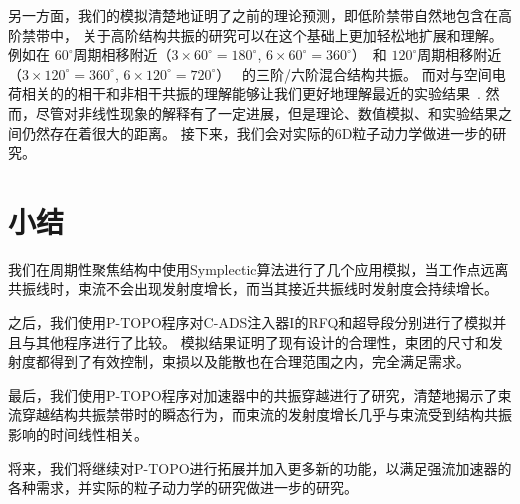 另一方面，我们的模拟清楚地证明了之前的理论预测，即低阶禁带自然地包含在高阶禁带中，
关于高阶结构共振的研究可以在这个基础上更加轻松地扩展和理解。
例如在 $60^{\circ}$周期相移附近（$3 \times 60^{\circ} = 180^{\circ}$, $6 \times 60^{\circ} = 360^{\circ}$）~\cite{16}和 $120^{\circ}$周期相移附近（$3 \times 120^{\circ} = 360^{\circ}$, $6 \times 120^{\circ} = 720^{\circ}$）~\cite{11,36}
的三阶/六阶混合结构共振。
而对与空间电荷相关的的相干和非相干共振的理解能够让我们更好地理解最近的实验结果~\cite{31,32,33}.
然而，尽管对非线性现象的解释有了一定进展，但是理论、数值模拟、和实验结果之间仍然存在着很大的距离。
接下来，我们会对实际的6D粒子动力学做进一步的研究。

\section{小结}                    \label{section:Simulation_conclusion}
我们在周期性聚焦结构中使用Symplectic算法进行了几个应用模拟，当工作点远离共振线时，束流不会出现发射度增长，而当其接近共振线时发射度会持续增长。

之后，我们使用P-TOPO程序对C-ADS注入器I的RFQ和超导段分别进行了模拟并且与其他程序进行了比较。
模拟结果证明了现有设计的合理性，束团的尺寸和发射度都得到了有效控制，束损以及能散也在合理范围之内，完全满足需求。

最后，我们使用P-TOPO程序对加速器中的共振穿越进行了研究，清楚地揭示了束流穿越结构共振禁带时的瞬态行为，而束流的发射度增长几乎与束流受到结构共振影响的时间线性相关。

将来，我们将继续对P-TOPO进行拓展并加入更多新的功能，以满足强流加速器的各种需求，并实际的粒子动力学的研究做进一步的研究。